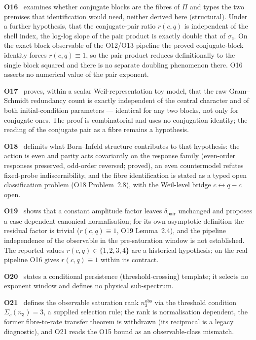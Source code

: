 \documentclass[11pt,a4paper]{article}
\theoremstyle{definition}
\newcommand{\dimpair}{\delta_{\mathrm{pair}}}
\newcommand{\nobs}{n^{\mathrm{obs}}_3}
\begin{document}
      \textbf{O16}~\cite{Beau2026a20} examines whether conjugate blocks are the fibres of $\Pi$
      and types the two premises that identification would need, neither derived here (structural).
      Under a further hypothesis, that the conjugate-pair ratio $r(c,q)$ is independent of the
      shell index, the log-log slope of the pair product is exactly double that of $\sigma_c$.
      On the exact block observable of the O12/O13 pipeline the proved conjugate-block identity
      forces $r(c,q) \equiv 1$, so the pair product reduces definitionally to the single block
      squared and there is no separate doubling phenomenon there.
      O16 asserts no numerical value of the pair exponent.

      \textbf{O17}~\cite{Beau2026a21} proves, within a scalar Weil-representation toy model, that
      the raw Gram--Schmidt redundancy count is exactly independent of the central character and of
      both initial-condition parameters --- identical for any two blocks, not only for conjugate
      ones.
      The proof is combinatorial and uses no conjugation identity; the reading of the conjugate
      pair as a fibre remains a hypothesis.

      \textbf{O18}~\cite{Beau2026a22} delimits what Born--Infeld structure contributes to that
      hypothesis: the action is even and parity acts covariantly on the response family
      (even-order responses preserved, odd-order reversed; proved), an even
      countermodel refutes fixed-probe indiscernibility, and the fibre identification is stated
      as a typed open classification problem (O18 Problem~2.8), with the Weil-level bridge
      $c \leftrightarrow q-c$ open.

      \textbf{O19}~\cite{Beau2026a23} shows that a constant amplitude factor leaves $\dimpair$
      unchanged and proposes a case-dependent canonical normalisation; for its own asymptotic
      definition the residual factor is trivial ($r(c,q) \equiv 1$, O19 Lemma~2.4), and the pipeline
      independence of the observable in the pre-saturation window is not established.
      The reported values $r(c, q) \in \{1, 2, 3, 4\}$ are a historical hypothesis; on the real
      pipeline O16 gives $r(c,q) \equiv 1$ within its contract.

      \textbf{O20}~\cite{Beau2026a24} states a conditional persistence (threshold-crossing) template;
      it selects no exponent window and defines no physical sub-spectrum.

      \textbf{O21}~\cite{Beau2026a25} defines the observable saturation rank $\nobs$ via the
      threshold condition $\Sigma_c(n_3) = 3$, a supplied selection rule; the rank is normalisation
      dependent, the former fibre-to-rate transfer theorem is withdrawn (its reciprocal is a
      legacy diagnostic), and O21 reads the O15 bound as an observable-class
      mismatch.
\end{document}
